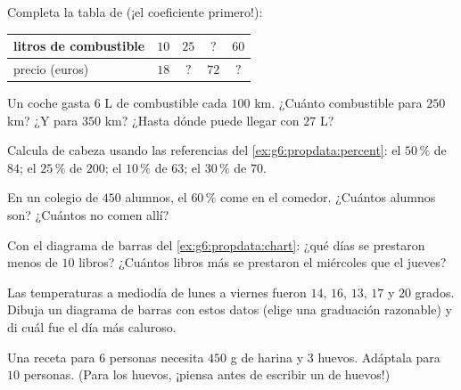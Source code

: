 \begin{exercise}[$\star$]\label{exo:g6:propdata:3}
Completa la tabla de  (¡el coeficiente primero!):
\begin{center}
\renewcommand{\arraystretch}{1.2}
\begin{tabular}{l|cccc}
litros de combustible & $10$ & $25$ & $?$ & $60$ \\
\hline
precio (euros) & $18$ & $?$ & $72$ & $?$ \\
\end{tabular}
\end{center}
\end{exercise}

\begin{exercise}[$\star$]\label{exo:g6:propdata:4}
Un coche gasta $6$ L de combustible cada $100$ km. ¿Cuánto combustible para $250$ km? ¿Y para
$350$ km? ¿Hasta dónde puede llegar con $27$ L?
\end{exercise}

\begin{exercise}[$\star$]\label{exo:g6:propdata:5}
Calcula de cabeza usando las referencias del \cref{ex:g6:propdata:percent}:
el $50\,\%$ de $84$; \quad el $25\,\%$ de $200$; \quad el $10\,\%$ de $63$;
\quad el $30\,\%$ de $70$.
\end{exercise}

\begin{exercise}[$\star$]\label{exo:g6:propdata:6}
En un colegio de $450$ alumnos, el $60\,\%$ come en el comedor. ¿Cuántos
alumnos son? ¿Cuántos no comen allí?
\end{exercise}

\begin{exercise}[$\star$]\label{exo:g6:propdata:7}
Con el diagrama de barras del \cref{ex:g6:propdata:chart}: ¿qué días se prestaron
menos de $10$ libros? ¿Cuántos libros más se prestaron el
miércoles que el jueves?
\end{exercise}

\begin{exercise}[$\star$]\label{exo:g6:propdata:8}
Las temperaturas a mediodía de lunes a viernes fueron $14$, $16$, $13$,
$17$ y $20$ grados. Dibuja un diagrama de barras con estos datos (elige una graduación
razonable) y di cuál fue el día más caluroso.
\end{exercise}

\begin{exercise}[$\star\star$]\label{exo:g6:propdata:9}
Una receta para $6$ personas necesita $450$ g de harina y $3$ huevos. Adáptala
para $10$ personas. (Para los huevos, ¡piensa antes de escribir un 
de huevos!)
\end{exercise}

